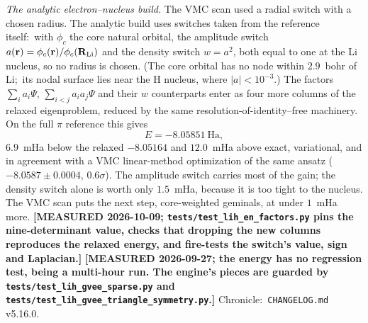 \documentclass[aps,pra,twocolumn,superscriptaddress,longbibliography]{revtex4-2}
\begin{document}
\emph{The analytic electron--nucleus build.}  The VMC scan used a radial switch
with a chosen radius.  The analytic build uses switches taken from the reference
itself:\ with $\phi_c$ the core natural orbital, the amplitude switch
$a(\mathbf r)=\phi_c(\mathbf r)/\phi_c(\mathbf R_{\rm Li})$ and the density switch
$w=a^2$, both equal to one at the Li nucleus, so no radius is chosen.  (The core
orbital has no node within $2.9$~bohr of Li;\ its nodal surface lies near the H
nucleus, where $|a|<10^{-3}$.)  The factors $\sum_i a_i\Psi$,
$\sum_{i<j}a_ia_j\Psi$ and their $w$ counterparts enter as four more columns of the
relaxed eigenproblem, reduced by the same resolution-of-identity--free machinery.
On the full $\pi$ reference this gives
\[
E = \mathbf{-8.05851}~\mathrm{Ha},
\]
$6.9$~mHa below the relaxed $-8.05164$ and $12.0$~mHa above exact, variational, and
in agreement with a VMC linear-method optimization of the same ansatz
($-8.0587\pm0.0004$, $0.6\sigma$).  The amplitude switch carries most of the gain;
the density switch alone is worth only $1.5$~mHa, because it is too tight to the
nucleus.  The VMC scan puts the next step, core-weighted geminals, at under
$1$~mHa more.  \textbf{[MEASURED 2026-10-09;
\texttt{tests/test\_lih\_en\_factors.py} pins the nine-determinant value, checks
that dropping the new columns reproduces the relaxed energy, and fire-tests the
switch's value, sign and Laplacian.]}
\textbf{[MEASURED 2026-09-27; the energy has no regression test, being a
multi-hour run.  The engine's pieces are guarded by
\texttt{tests/test\_lih\_gvee\_sparse.py} and
\texttt{tests/test\_lih\_gvee\_triangle\_symmetry.py}.]}  Chronicle:\
\texttt{CHANGELOG.md} v5.16.0.
\end{document}
